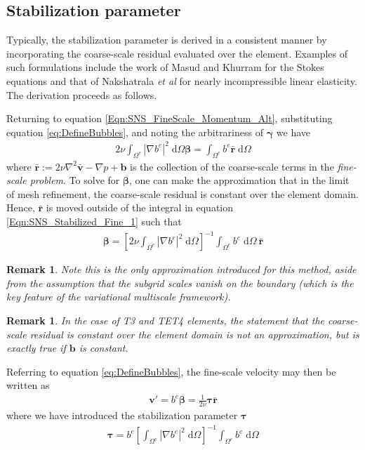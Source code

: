 \documentclass[11pt]{amsart}
\newtheorem{remark}[theorem]{Remark}
\begin{document}
\subsection{Stabilization parameter}
Typically, the stabilization parameter is derived in a consistent manner by incorporating the coarse-scale residual evaluated over the element.  Examples of such formulations include the work of Masud and Khurram \cite{Masud} for the Stokes equations and that of Nakshatrala \emph{et al} \cite{Nakshatrala} for nearly incompressible linear elasticity.  The derivation proceeds as follows.

Returning to equation \eqref{Eqn:SNS_FineScale_Momentum_Alt}, substituting equation \eqref{eq:DefineBubbles}, and noting the arbitrariness of $\boldsymbol{\gamma}$ we have
\begin{align}
  \label{Eqn:SNS_Stabilized_Fine_1}
2\nu \int_{\Omega^e} \left| \nabla b^e \right|^2 \; \mathrm{d} \Omega \boldsymbol{\beta}
= \int_{\Omega^e} b^e \bar{\boldsymbol{r}} \; \mathrm{d} \Omega
\end{align}
where $\bar{\boldsymbol{r}} := 2\nu \nabla^2 \bar{\boldsymbol{v}} - \nabla p + \boldsymbol{b}$ is the collection of the coarse-scale terms in the \emph{fine-scale problem}. To solve for $\boldsymbol{\beta}$, one can make the approximation that in the limit of mesh refinement, the coarse-scale residual is constant over the element domain.  Hence, $\bar{\boldsymbol{r}}$ is moved outside of the integral in equation \eqref{Eqn:SNS_Stabilized_Fine_1} such that 
\begin{align}
  \label{Eqn:SNS_Stabilized_Fine_2}
\boldsymbol{\beta} = \left[ 2\nu \int_{\Omega^e} \left| \nabla b^e \right|^2 \; \mathrm{d} \Omega \right]^{-1} \int_{\Omega^e} b^e \; \mathrm{d} \Omega \ \bar{\boldsymbol{r}}
\end{align}
\begin{remark}
Note this is the only approximation introduced for this method, aside from the assumption that the subgrid scales vanish on the boundary (which is the key feature of the variational multiscale framework).
\end{remark}
\begin{remark}
\label{remark:ResidRemark}
In the case of T3 and TET4 elements, the statement that the coarse-scale residual is constant over the element domain is not an approximation, but is exactly true if $\boldsymbol{b}$ is constant.
\end{remark}
Referring to equation \eqref{eq:DefineBubbles}, the fine-scale velocity may then be written as
\begin{align}
  \label{Eqn:SNS_Define_Velocity_Fine}
\boldsymbol{v}' = b^e \boldsymbol{\beta} = \frac{1}{2\nu}\boldsymbol{\tau}\bar{\boldsymbol{r}}
\end{align}
where we have introduced the stabilization parameter $\boldsymbol{\tau}$
\begin{align}
  \label{Eqn:SNS_Define_Tau}
\boldsymbol{\tau} = b^e \left[\int_{\Omega^e}  \left| \nabla b^e \right|^2 \; \mathrm{d} \Omega \right]^{-1} \int_{\Omega^e} b^e \; \mathrm{d} \Omega
\end{align}
\end{document}
